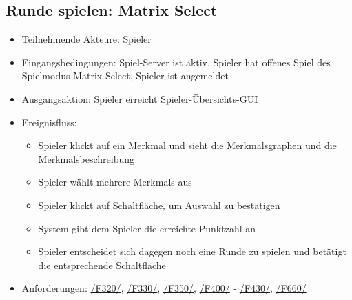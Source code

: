 \documentclass[a4paper]{scrreprt}
\begin{document}
    \subsection{Runde spielen: Matrix Select}
    \begin{itemize}
    	\item Teilnehmende Akteure: \Gls{Spieler}

    	\item Eingangsbedingungen: \Gls{Spiel-Server} ist aktiv, \Gls{Spieler} hat offenes \Gls{Spiel} des \Gls{Spielmodus} Matrix Select, \Gls{Spieler} ist angemeldet
        \item Ausgangsaktion: \Gls{Spieler} erreicht Spieler-Übersichts-GUI
    	\item Ereignisfluss:
    	\begin{itemize}
    		\item \Gls{Spieler} klickt auf ein \Gls{Merkmal} und sieht die Merkmalsgraphen und die Merkmalsbeschreibung
    		\item \Gls{Spieler} wählt mehrere \Glspl{Merkmal} aus
    		\item \Gls{Spieler} klickt auf Schaltfläche, um Auswahl zu bestätigen
    		\item System gibt dem \Gls{Spieler} die erreichte Punktzahl an
    		\item \Gls{Spieler} entscheidet sich dagegen noch eine Runde zu spielen und betätigt die entsprechende Schaltfläche
    	\end{itemize}
        \item Anforderungen: \hyperlink{F320}{/F320/}, \hyperlink{F330}{/F330/}, \hyperlink{F350}{/F350/}, \hyperlink{F400}{/F400/} - \hyperlink{F430}{/F430/}, \hyperlink{F660}{/F660/}

    \end{itemize}
	
\end{document}
